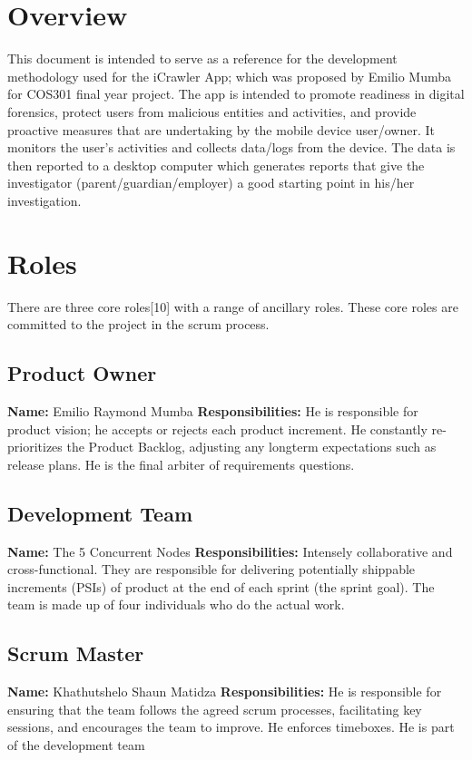 \documentclass[hidelinks, 12pt, oneside]{article}
\begin{document}
	
	
	\tableofcontents
	\newpage
	
	\section{Overview}
	\begin{flushleft}
		This document is intended to serve as a reference for the development methodology used for the iCrawler App; which was proposed 
	by Emilio Mumba for COS301 final year project.\newline\newline
	The app is intended to promote readiness in digital forensics, protect users from malicious entities and activities, and provide proactive 
	measures that are undertaking by the mobile device user/owner. It monitors the user's activities and collects data/logs from the device. The data
	is then reported to a desktop computer which generates reports that give the investigator (parent/guardian/employer) a good starting point in his/her investigation.\newpage
	\end{flushleft}

	
	\section{Roles}
	There are three core roles[10] with a range of ancillary roles. These core roles are committed to the project in the scrum process.
	\subsection{Product Owner}
	\textbf{Name:} Emilio Raymond Mumba\newline
	\textbf{Responsibilities:} He is responsible for product vision; he accepts or rejects each product increment. He constantly re-prioritizes the Product Backlog, adjusting any longterm expectations such as release plans. He is the final arbiter of requirements questions.
 	\subsection{Development Team}
 	\textbf{Name:} The 5 Concurrent Nodes\newline
	\textbf{Responsibilities:} Intensely collaborative and cross-functional. They are responsible for delivering potentially shippable increments (PSIs) of product at the end of each sprint (the sprint goal). 
	The team
	is made up of four individuals who do the actual work.
	\subsection{Scrum Master}
 	\textbf{Name:} Khathutshelo Shaun Matidza\newline
	\textbf{Responsibilities:} He is responsible for ensuring that the team follows the agreed scrum processes, facilitating key sessions, and encourages 
	the team to improve. He enforces timeboxes. He is part of the development team\newpage
	
\end{document}
